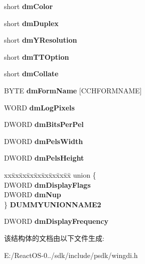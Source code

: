 \begin{DoxyCompactItemize}
\begin{tabbing}
\end{tabbing}\item 
\mbox{\label{struct__devicemode_a_a11e963cb5b4d890cb02bc93bafa77050}} 
short {\bfseries dm\+Color}
\item 
\mbox{\label{struct__devicemode_a_a0ad4d0b6752e60273b4b58aab4c1bb3f}} 
short {\bfseries dm\+Duplex}
\item 
\mbox{\label{struct__devicemode_a_a9e1e6165004af2427fc02ad5671a8f8e}} 
short {\bfseries dm\+Y\+Resolution}
\item 
\mbox{\label{struct__devicemode_a_ad66e9a85a73e9bd4aee72d80847efa05}} 
short {\bfseries dm\+T\+T\+Option}
\item 
\mbox{\label{struct__devicemode_a_ac7f8ae6d6244eb619731e79387628891}} 
short {\bfseries dm\+Collate}
\item 
\mbox{\label{struct__devicemode_a_a01f8207058ec4e604ed18c844f6651c2}} 
B\+Y\+TE {\bfseries dm\+Form\+Name} \mbox{[}C\+C\+H\+F\+O\+R\+M\+N\+A\+ME\mbox{]}
\item 
\mbox{\label{struct__devicemode_a_aa29826494cd0a37fa1766caf021e108a}} 
W\+O\+RD {\bfseries dm\+Log\+Pixels}
\item 
\mbox{\label{struct__devicemode_a_a87757f8eb436fa07a67f2511856be41f}} 
D\+W\+O\+RD {\bfseries dm\+Bits\+Per\+Pel}
\item 
\mbox{\label{struct__devicemode_a_a7049d8be03c165b01b111bb809816a8e}} 
D\+W\+O\+RD {\bfseries dm\+Pels\+Width}
\item 
\mbox{\label{struct__devicemode_a_a7a8afc33dcb3f2902597aa880e3858f3}} 
D\+W\+O\+RD {\bfseries dm\+Pels\+Height}
\item 
\mbox{\label{struct__devicemode_a_a462d09a13a32beff25fa8df8024fbabd}} 
\begin{tabbing}
xx\=xx\=xx\=xx\=xx\=xx\=xx\=xx\=xx\=\kill
union \{\\
\>DWORD {\bfseries dmDisplayFlags}\\
\>DWORD {\bfseries dmNup}\\
\} {\bfseries DUMMYUNIONNAME2}\\

\end{tabbing}\item 
\mbox{\label{struct__devicemode_a_a20c4c8d8a33dc67734e7d6b8b7a7ce26}} 
D\+W\+O\+RD {\bfseries dm\+Display\+Frequency}
\end{DoxyCompactItemize}


该结构体的文档由以下文件生成\+:\begin{DoxyCompactItemize}
\item 
E\+:/\+React\+O\+S-\/0../sdk/include/psdk/wingdi.\+h\end{DoxyCompactItemize}
